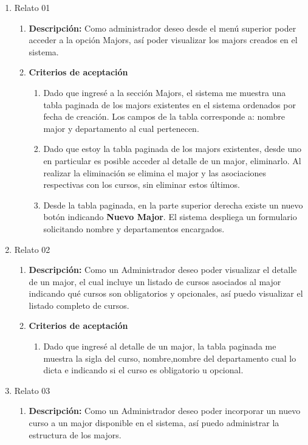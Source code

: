 \begin{enumerate}
	\item Relato 01
		\begin{enumerate}
			\item \textbf{Descripción:} Como administrador deseo desde el menú superior poder acceder a la opción Majors, así poder visualizar los majors creados en el sistema.
			\item \textbf{Criterios de aceptación}
				\begin{enumerate}
					\item Dado que ingresé a la sección Majors, el sistema me muestra una tabla paginada de los majors existentes en el sistema ordenados por fecha de creación. Los campos de la tabla corresponde a: nombre major y departamento al cual pertenecen.
					\item Dado que estoy la tabla paginada de los majors existentes, desde uno en particular es posible acceder al detalle de un major, eliminarlo. Al realizar la eliminación se elimina el major y las asociaciones respectivas con los cursos, sin eliminar estos últimos.
					\item Desde la tabla paginada, en la parte superior derecha existe un nuevo botón indicando \textbf{Nuevo Major}. El sistema despliega un formulario solicitando nombre y departamentos encargados.
				\end{enumerate}
		\end{enumerate}
	\item Relato 02
		\begin{enumerate}
			\item \textbf{Descripción:} Como un Administrador deseo poder visualizar el detalle de un major, el cual incluye un listado de cursos asociados al major indicando qué cursos son obligatorios y opcionales, así puedo visualizar el listado completo de cursos.
			\item \textbf{Criterios de aceptación}
				\begin{enumerate}
					\item Dado que ingresé al detalle de un major, la tabla paginada me muestra la sigla del curso, nombre,nombre del departamento cual lo dicta e indicando si el curso es obligatorio u opcional.
				\end{enumerate}
		\end{enumerate}
	\item Relato 03
		\begin{enumerate}
			\item \textbf{Descripción:} Como un Administrador deseo poder incorporar un nuevo curso a un major disponible en el sistema, así puedo administrar la estructura de los majors.

\end{enumerate}
\end{enumerate}
